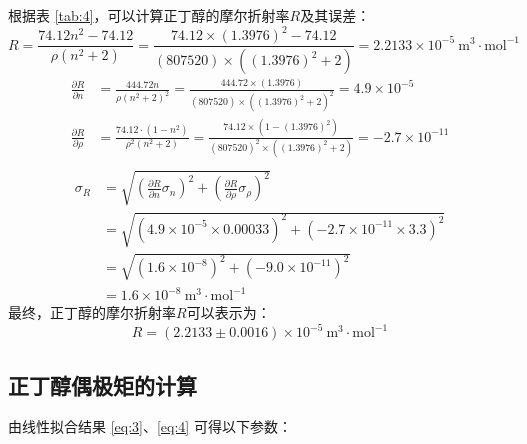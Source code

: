 \documentclass[cn,hazy,pku,12pt,normal,math=newtx,cite=super]{elegantnote}
\begin{document}
根据表 \ref{tab:4}，可以计算正丁醇的摩尔折射率$R$及其误差：
\begin{equation*}
R=\frac{74.12 n^{2} - 74.12}{\rho \left(n^{2} + 2\right)}=\frac{74.12 \times \left(1.3976\right)^{2} - 74.12}{\left(807520\right) \times \left(\left(1.3976\right)^{2} + 2\right)}=2.2133 \times 10^{-5}\mathrm{~ m^3\cdot mol^{-1}}
\end{equation*}
\begin{equation*}
\begin{aligned}
\frac{\partial R }{\partial n }&=\frac{444.72 n}{\rho \left(n^{2} + 2\right)^{2}}=\frac{444.72 \times \left(1.3976\right)}{\left(807520\right) \times \left(\left(1.3976\right)^{2} + 2\right)^{2}}=4.9 \times 10^{-5}\\
\frac{\partial R }{\partial \rho }&=\frac{74.12 \cdot \left(1 - n^{2}\right)}{\rho^{2} \left(n^{2} + 2\right)}=\frac{74.12 \times \left(1 - \left(1.3976\right)^{2}\right)}{\left(807520\right)^{2} \times \left(\left(1.3976\right)^{2} + 2\right)}=-2.7 \times 10^{-11}\\
\end{aligned}
\end{equation*}
\begin{equation*}
\begin{aligned}
\sigma_{R}&=\sqrt{\left(\frac{\partial R }{\partial n } \sigma_{n}\right)^2+\left(\frac{\partial R }{\partial \rho } \sigma_{\rho}\right)^2}\\
&=\sqrt{\left(4.9 \times 10^{-5} \times 0.00033\right)^2+\left(-2.7 \times 10^{-11} \times 3.3\right)^2}\\
&=\sqrt{\left(1.6 \times 10^{-8}\right)^2+\left(-9.0 \times 10^{-11}\right)^2}\\
&=1.6 \times 10^{-8}\mathrm{~ m^3\cdot mol^{-1}}
\end{aligned}
\end{equation*}
最终，正丁醇的摩尔折射率$R$可以表示为：
\begin{equation*}
R=(2.2133  \pm 0.0016 )\times 10^{-5}\mathrm{~ m^3\cdot mol^{-1}}
\end{equation*}

\subsection{正丁醇偶极矩的计算}

由线性拟合结果 \eqref{eq:3}、\eqref{eq:4} 可得以下参数：
\end{document}
